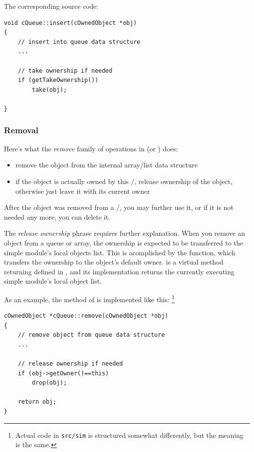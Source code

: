 The corresponding source code:

\begin{verbatim}
void cQueue::insert(cOwnedObject *obj)
{
    // insert into queue data structure
    ...

    // take ownership if needed
    if (getTakeOwnership())
        take(obj);

}
\end{verbatim}


\subsubsection{Removal}

Here's what the \textit{remove} family of operations in 
(or ) does:

\begin{itemize}
    \item{remove the object from the internal array/list data structure}

    \item{if the object is actually owned by this /,
    release ownership of the object, otherwise just leave it with
    its current owner}
\end{itemize}

After the object was removed from a /,
you may further use it, or if it is not needed any more, you can delete it.

The \textit{release ownership} phrase requires further explanation.
When you remove an object from a queue or array, the ownership
is expected to be transferred to the simple module's local objects list.
This is acomplished by the  function, which transfers the
ownership to the object's default owner.
 is a virtual method returning 
defined in , and its implementation returns
the currently executing simple module's local object list.

As an example, the  method of  is
implemented like this:
  \footnote{Actual code in \texttt{src/sim} is structured somewhat
  differently, but the meaning is the same.}

\begin{verbatim}
cOwnedObject *cQueue::remove(cOwnedObject *obj)
{
    // remove object from queue data structure
    ...

    // release ownership if needed
    if (obj->getOwner()==this)
        drop(obj);

    return obj;
}
\end{verbatim}


